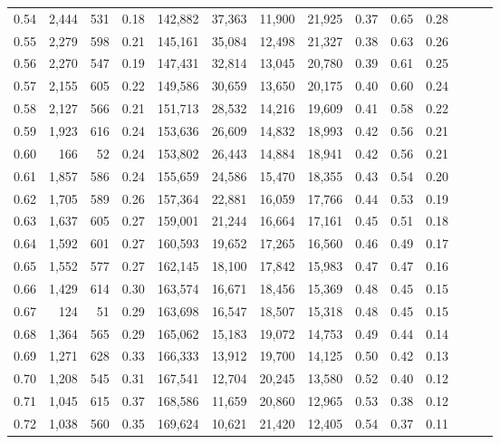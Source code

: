 \begin{tabular}{rrrrrrrrrrrrrr}
0.54 &  2,444 &    531 &  0.18 &  142,882 &   37,363 &  11,900 &  21,925 &  0.37 &  0.65 &      0.28 \\
0.55 &  2,279 &    598 &  0.21 &  145,161 &   35,084 &  12,498 &  21,327 &  0.38 &  0.63 &      0.26 \\
0.56 &  2,270 &    547 &  0.19 &  147,431 &   32,814 &  13,045 &  20,780 &  0.39 &  0.61 &      0.25 \\
0.57 &  2,155 &    605 &  0.22 &  149,586 &   30,659 &  13,650 &  20,175 &  0.40 &  0.60 &      0.24 \\
0.58 &  2,127 &    566 &  0.21 &  151,713 &   28,532 &  14,216 &  19,609 &  0.41 &  0.58 &      0.22 \\
0.59 &  1,923 &    616 &  0.24 &  153,636 &   26,609 &  14,832 &  18,993 &  0.42 &  0.56 &      0.21 \\
0.60 &    166 &     52 &  0.24 &  153,802 &   26,443 &  14,884 &  18,941 &  0.42 &  0.56 &      0.21 \\
0.61 &  1,857 &    586 &  0.24 &  155,659 &   24,586 &  15,470 &  18,355 &  0.43 &  0.54 &      0.20 \\
0.62 &  1,705 &    589 &  0.26 &  157,364 &   22,881 &  16,059 &  17,766 &  0.44 &  0.53 &      0.19 \\
0.63 &  1,637 &    605 &  0.27 &  159,001 &   21,244 &  16,664 &  17,161 &  0.45 &  0.51 &      0.18 \\
0.64 &  1,592 &    601 &  0.27 &  160,593 &   19,652 &  17,265 &  16,560 &  0.46 &  0.49 &      0.17 \\
0.65 &  1,552 &    577 &  0.27 &  162,145 &   18,100 &  17,842 &  15,983 &  0.47 &  0.47 &      0.16 \\
0.66 &  1,429 &    614 &  0.30 &  163,574 &   16,671 &  18,456 &  15,369 &  0.48 &  0.45 &      0.15 \\
0.67 &    124 &     51 &  0.29 &  163,698 &   16,547 &  18,507 &  15,318 &  0.48 &  0.45 &      0.15 \\
0.68 &  1,364 &    565 &  0.29 &  165,062 &   15,183 &  19,072 &  14,753 &  0.49 &  0.44 &      0.14 \\
0.69 &  1,271 &    628 &  0.33 &  166,333 &   13,912 &  19,700 &  14,125 &  0.50 &  0.42 &      0.13 \\
0.70 &  1,208 &    545 &  0.31 &  167,541 &   12,704 &  20,245 &  13,580 &  0.52 &  0.40 &      0.12 \\
0.71 &  1,045 &    615 &  0.37 &  168,586 &   11,659 &  20,860 &  12,965 &  0.53 &  0.38 &      0.12 \\
0.72 &  1,038 &    560 &  0.35 &  169,624 &   10,621 &  21,420 &  12,405 &  0.54 &  0.37 &      0.11 \\

\end{tabular}

